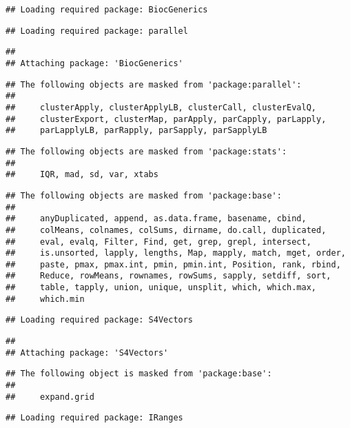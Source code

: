 \documentclass[]{article}
\begin{document}
\begin{verbatim}
## Loading required package: BiocGenerics
\end{verbatim}

\begin{verbatim}
## Loading required package: parallel
\end{verbatim}

\begin{verbatim}
## 
## Attaching package: 'BiocGenerics'
\end{verbatim}

\begin{verbatim}
## The following objects are masked from 'package:parallel':
## 
##     clusterApply, clusterApplyLB, clusterCall, clusterEvalQ,
##     clusterExport, clusterMap, parApply, parCapply, parLapply,
##     parLapplyLB, parRapply, parSapply, parSapplyLB
\end{verbatim}

\begin{verbatim}
## The following objects are masked from 'package:stats':
## 
##     IQR, mad, sd, var, xtabs
\end{verbatim}

\begin{verbatim}
## The following objects are masked from 'package:base':
## 
##     anyDuplicated, append, as.data.frame, basename, cbind,
##     colMeans, colnames, colSums, dirname, do.call, duplicated,
##     eval, evalq, Filter, Find, get, grep, grepl, intersect,
##     is.unsorted, lapply, lengths, Map, mapply, match, mget, order,
##     paste, pmax, pmax.int, pmin, pmin.int, Position, rank, rbind,
##     Reduce, rowMeans, rownames, rowSums, sapply, setdiff, sort,
##     table, tapply, union, unique, unsplit, which, which.max,
##     which.min
\end{verbatim}

\begin{verbatim}
## Loading required package: S4Vectors
\end{verbatim}

\begin{verbatim}
## 
## Attaching package: 'S4Vectors'
\end{verbatim}

\begin{verbatim}
## The following object is masked from 'package:base':
## 
##     expand.grid
\end{verbatim}

\begin{verbatim}
## Loading required package: IRanges
\end{verbatim}
\end{document}
